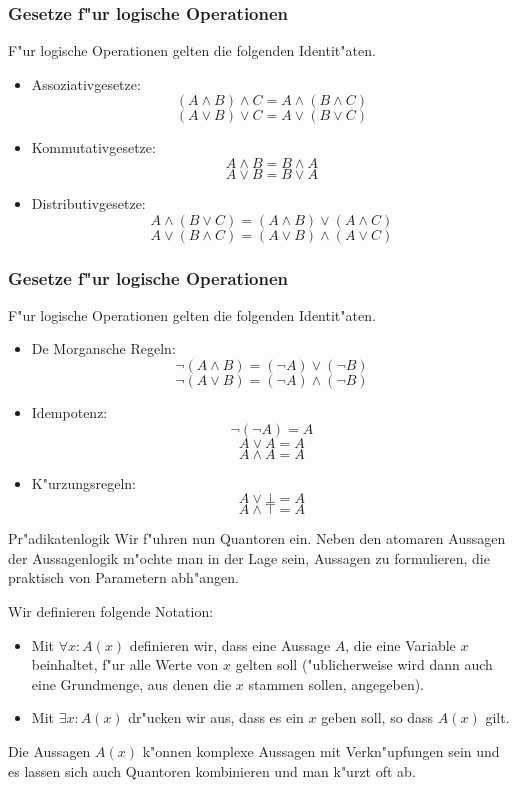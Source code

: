 \documentclass{beamer}
\begin{document}
\begin{frame}
  \frametitle{Gesetze f"ur logische Operationen}
  F"ur logische Operationen gelten die folgenden Identit"aten. 
  \begin{itemize}
    \item Assoziativgesetze: \[(A\wedge B)\wedge C = A\wedge(B\wedge C)\] \[(A\vee B)\vee C = A\vee(B\vee C)\]
    \item Kommutativgesetze: \[A\wedge B = B\wedge A\]\[A\vee B = B\vee A\]
    \item Distributivgesetze: \[A \wedge (B\vee C) = (A\wedge B)\vee (A\wedge C)\] \[A\vee (B\wedge C) = (A\vee B)\wedge (A\vee C)\]
  \end{itemize}
   
\end{frame}


\begin{frame}
  \frametitle{Gesetze f"ur logische Operationen}
  F"ur logische Operationen gelten die folgenden Identit"aten. 
  \begin{itemize}
    \item De Morgansche Regeln: \[\neg(A\wedge B) = (\neg A)\vee(\neg B)\]\[\neg(A\vee B) = (\neg A)\wedge(\neg B)\]
    \item Idempotenz: \[\neg(\neg A) = A\]\[A\vee A = A\]\[A\wedge A = A\]
    \item K"urzungsregeln: \[A\vee\bot=A\]\[A\wedge\top=A\]
  \end{itemize}
   
\end{frame}

\begin{frame}{Pr"adikatenlogik}
  Wir f"uhren nun Quantoren ein. Neben den atomaren Aussagen der Aussagenlogik m"ochte man in der Lage sein, Aussagen zu formulieren, die praktisch von Parametern abh"angen.
  \begin{definition}[Quantoren]
    Wir definieren folgende Notation:
    \begin{itemize}
      \item Mit $\forall x:A(x)$ definieren wir, dass eine Aussage $A$, die eine Variable $x$ beinhaltet, f"ur alle Werte von $x$ gelten soll ("ublicherweise wird dann auch eine Grundmenge, aus denen die $x$ stammen sollen, angegeben).
      \item Mit $\exists x:A(x)$ dr"ucken wir aus, dass es ein $x$ geben soll, so dass $A(x)$ gilt.
    \end{itemize}
  \end{definition}

  Die Aussagen $A(x)$ k"onnen komplexe Aussagen mit Verkn"upfungen sein und es lassen sich auch Quantoren kombinieren und man k"urzt oft ab.
\end{frame}
\end{document}
